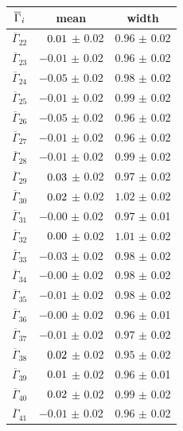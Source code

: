 \begin{table}[!tb]
\hspace{1em}
\begin{tabular}{c|c|c}
$\overline{\Gamma}_{\it{i}}$ & mean & width \\ 
\hline
$\overline{\Gamma}_{22}$ & $\hphantom{-}0.01$ $\pm$ 0.02 & $0.96$ $\pm$ 0.02 \\ 
$\overline{\Gamma}_{23}$ & $-0.01$ $\pm$ 0.02 & $0.96$ $\pm$ 0.02 \\ 
$\overline{\Gamma}_{24}$ & $-0.05$ $\pm$ 0.02 & $0.98$ $\pm$ 0.02 \\ 
$\overline{\Gamma}_{25}$ & $-0.01$ $\pm$ 0.02 & $0.99$ $\pm$ 0.02 \\ 
$\overline{\Gamma}_{26}$ & $-0.05$ $\pm$ 0.02 & $0.96$ $\pm$ 0.02 \\ 
$\overline{\Gamma}_{27}$ & $-0.01$ $\pm$ 0.02 & $0.96$ $\pm$ 0.02 \\ 
$\overline{\Gamma}_{28}$ & $-0.01$ $\pm$ 0.02 & $0.99$ $\pm$ 0.02 \\ 
$\overline{\Gamma}_{29}$ & $\hphantom{-}0.03$ $\pm$ 0.02 & $0.97$ $\pm$ 0.02 \\ 
$\overline{\Gamma}_{30}$ & $\hphantom{-}0.02$ $\pm$ 0.02 & $1.02$ $\pm$ 0.02 \\ 
$\overline{\Gamma}_{31}$ & $-0.00$ $\pm$ 0.02 & $0.97$ $\pm$ 0.01 \\ 
$\overline{\Gamma}_{32}$ & $\hphantom{-}0.00$ $\pm$ 0.02 & $1.01$ $\pm$ 0.02 \\ 
$\overline{\Gamma}_{33}$ & $-0.03$ $\pm$ 0.02 & $0.98$ $\pm$ 0.02 \\ 
$\overline{\Gamma}_{34}$ & $-0.00$ $\pm$ 0.02 & $0.98$ $\pm$ 0.02 \\ 
$\overline{\Gamma}_{35}$ & $-0.01$ $\pm$ 0.02 & $0.98$ $\pm$ 0.02 \\ 
$\overline{\Gamma}_{36}$ & $-0.00$ $\pm$ 0.02 & $0.96$ $\pm$ 0.01 \\ 
$\overline{\Gamma}_{37}$ & $-0.01$ $\pm$ 0.02 & $0.97$ $\pm$ 0.02 \\ 
$\overline{\Gamma}_{38}$ & $\hphantom{-}0.02$ $\pm$ 0.02 & $0.95$ $\pm$ 0.02 \\ 
$\overline{\Gamma}_{39}$ & $\hphantom{-}0.01$ $\pm$ 0.02 & $0.96$ $\pm$ 0.01 \\ 
$\overline{\Gamma}_{40}$ & $\hphantom{-}0.02$ $\pm$ 0.02 & $0.99$ $\pm$ 0.02 \\ 
$\overline{\Gamma}_{41}$ & $-0.01$ $\pm$ 0.02 & $0.96$ $\pm$ 0.02 \\ 
\end{tabular}
\label{table:spd:toy_pulls}
\end{table}

